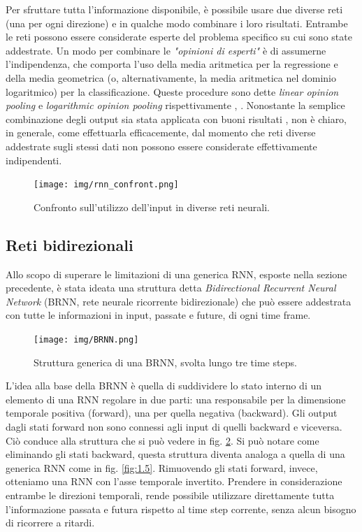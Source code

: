 Per sfruttare tutta l'informazione disponibile, è possibile usare due diverse reti (una per ogni direzione) e in qualche modo combinare i loro risultati. Entrambe le reti possono essere considerate esperte del problema specifico su cui sono state addestrate. Un modo per combinare le \textit{"opinioni di esperti"} è di assumerne l'indipendenza, che comporta l'uso della media aritmetica per la regressione e della media geometrica (o, alternativamente, la media aritmetica nel dominio logaritmico) per la classificazione. Queste procedure sono dette \textit{linear opinion pooling} e \textit{logarithmic opinion pooling} rispettivamente \cite{SDT}, \cite{combining}. Nonostante la semplice combinazione degli output sia stata applicata con buoni risultati \cite{phone1}, non è chiaro, in generale, come effettuarla efficacemente, dal momento che reti diverse addestrate sugli stessi dati non possono essere considerate effettivamente indipendenti.
\begin{figure}[ht]
	\centering
	\texttt{[image: img/rnn\_confront.png]}
	\caption{Confronto sull'utilizzo dell'input in diverse reti neurali.}
	\label{fig:1.10}
\end{figure}
\subsection{Reti bidirezionali}
\label{sub:reti_bidirezionali}
Allo scopo di superare le limitazioni di una generica RNN, esposte nella sezione precedente, è stata ideata una struttura detta \textit{Bidirectional Recurrent Neural Network} (BRNN, rete neurale ricorrente bidirezionale) che può essere addestrata con tutte le informazioni in input, passate e future, di ogni time frame.
\begin{figure}[ht]
	\centering
	\texttt{[image: img/BRNN.png]}
	\caption{Struttura generica di una BRNN, svolta lungo tre time steps.}
	\label{fig:1.11}
\end{figure}

L'idea alla base della BRNN è quella di suddividere lo stato interno di un elemento di una RNN regolare in due parti: una responsabile per la dimensione temporale positiva (forward), una per quella negativa (backward). Gli output dagli stati forward non sono connessi agli input di quelli backward e viceversa. Ciò conduce alla struttura che si può vedere in fig. \ref{fig:1.11}.
Si può notare come eliminando gli stati backward, questa struttura diventa analoga a quella di una generica RNN come in fig. \ref{fig:1.5}. Rimuovendo gli stati forward, invece, otteniamo una RNN con l'asse temporale invertito. Prendere in considerazione entrambe le direzioni temporali, rende possibile utilizzare direttamente tutta l'informazione passata e futura rispetto al time step corrente, senza alcun bisogno di ricorrere a ritardi.

